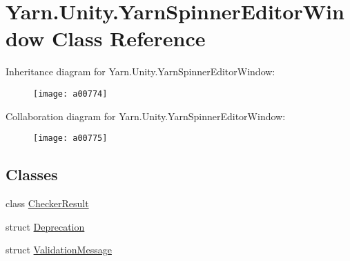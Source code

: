 \hypertarget{a00176}{\section{Yarn.\-Unity.\-Yarn\-Spinner\-Editor\-Window Class Reference}
\label{a00176}
}


Inheritance diagram for Yarn.\-Unity.\-Yarn\-Spinner\-Editor\-Window\-:
\nopagebreak
\begin{figure}[H]
\begin{center}
\leavevmode
\texttt{[image: a00774]}
\end{center}
\end{figure}


Collaboration diagram for Yarn.\-Unity.\-Yarn\-Spinner\-Editor\-Window\-:
\nopagebreak
\begin{figure}[H]
\begin{center}
\leavevmode
\texttt{[image: a00775]}
\end{center}
\end{figure}
\subsection*{Classes}
\begin{DoxyCompactItemize}
\item 
class \hyperlink{a00039}{Checker\-Result}
\item 
struct \hyperlink{a00080}{Deprecation}
\item 
struct \hyperlink{a00176_a00365}{Validation\-Message}
\end{DoxyCompactItemize}
